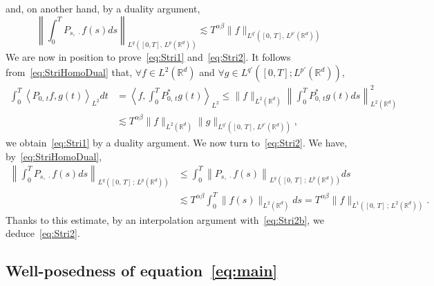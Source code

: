 \documentclass[10pt]{amsart}
\theoremstyle{definition}\newtheorem{defi}[theo]{Definition}\newtheorem{rema}[theo]{Remark}\newtheorem{exam}[theo]{Example}\newtheorem{exem}[theo]{Example}\newtheorem{nota}[theo]{Notation}
\newcommand{\bbR}{\mathbb{R}}
\let\oldforall\forall
\renewcommand*{\forall}{\mathrel{\oldforall}}
\begin{document}
and, on another hand, by a duality argument,
\begin{equation}\label{eq:Stri2b}
\left\| \int_0^T P_{s,\,\cdot} f(s) ds \right\|_{L^{q}\left([0,T],\,L^p\left(\bbR^d\right)\right)} \lesssim T^{\alpha\beta}\|f\|_{L^{q'}\left([0,\,T],\,L^{p'}\left(\bbR^d\right)\right)}
\end{equation}
We are now in position to prove~\eqref{eq:Stri1} and~\eqref{eq:Stri2}. It follows from~\eqref{eq:StriHomoDual} that, $\forall f\in L^2(\bbR^d)$ and $\forall g\in L^{q'}([0,T];L^{p'}(\bbR^d))$,
\begin{align*}
\int_{0}^T \left\langle P_{0,\,t}f,g(t) \right\rangle_{L^2} dt &= \left\langle f, \int_0^T P_{0,\,t}^*g(t)\right\rangle_{L^2} \leq \|f\|_{L^2(\bbR^d)} \left\|\int_0^T P_{0,\,t}^* g(t) ds \right\|_{L^2\left(\bbR^d\right)}^2\\
&\lesssim T^{\alpha\beta}\|f\|_{L^2\left(\bbR^d\right)} \|g\|_{L^{q'}\left([0,\,T],\,L^{p'}\left(\bbR^d\right)\right)},
\end{align*}
we obtain~\eqref{eq:Stri1} by a duality argument. We now turn to~\eqref{eq:Stri2}. We have, by~\eqref{eq:StriHomoDual},
\begin{align*}
\left\|\int_0^T P_{s,\,\cdot} f(s) ds\right\|_{L^q\left([0,\,T]\,;\,L^p\left(\bbR^d\right)\right)} &\leq \int_0^T \left\|P_{s,\,\cdot} f(s) \right\|_{L^q\left([0,\,T]\,;\,L^p\left(\bbR^d\right)\right)} ds
\\
&\lesssim T^{\alpha\beta} \int_0^T \|f(s)\|_{L^2\left(\bbR^d\right)} ds = T^{\alpha\beta} \|f\|_{L^1\left([0,\,T]\,;\,L^2\left(\bbR^d\right)\right)}.
\end{align*}
Thanks to this estimate, by an interpolation argument with~\eqref{eq:Stri2b}, we deduce~\eqref{eq:Stri2}.

\subsection{Well-posedness of equation~\eqref{eq:main}}
\end{document}
